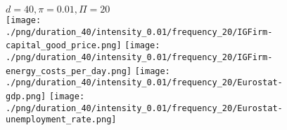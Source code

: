 \begin{figure}[ht!]
\centering\leavevmode
\begin{minipage}{13cm}
\centering\leavevmode
{$d=40, \pi=0.01, \Pi=20$}\\
\texttt{[image: ./png/duration\_40/intensity\_0.01/frequency\_20/IGFirm-capital\_good\_price.png]}
\texttt{[image: ./png/duration\_40/intensity\_0.01/frequency\_20/IGFirm-energy\_costs\_per\_day.png]}
\texttt{[image: ./png/duration\_40/intensity\_0.01/frequency\_20/Eurostat-gdp.png]}
\texttt{[image: ./png/duration\_40/intensity\_0.01/frequency\_20/Eurostat-unemployment\_rate.png]}
\end{minipage}
\end{figure}

